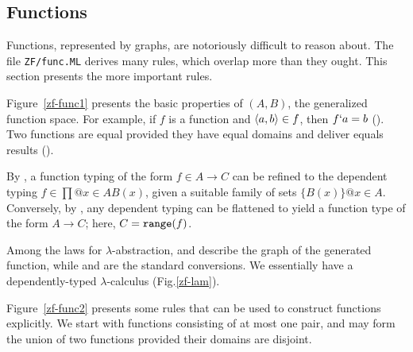 \subsection{Functions}
Functions, represented by graphs, are notoriously difficult to reason
about.  The file \texttt{ZF/func.ML} derives many rules, which overlap more
than they ought.  This section presents the more important rules.

Figure~\ref{zf-func1} presents the basic properties of $(A,B)$,
the generalized function space.  For example, if $f$ is a function and
$\langle a,b\rangle\in f$, then $f`a=b$ ().  Two functions
are equal provided they have equal domains and deliver equals results
().

By , a function typing of the form $f\in A\to C$ can be
refined to the dependent typing $f\in\prod@{x\in A}B(x)$, given a suitable
family of sets $\{B(x)\}@{x\in A}$.  Conversely, by ,
any dependent typing can be flattened to yield a function type of the form
$A\to C$; here, $C={\tt range}(f)$.

Among the laws for $\lambda$-abstraction,  and 
describe the graph of the generated function, while  and
 are the standard conversions.  We essentially have a
dependently-typed $\lambda$-calculus (Fig.\ts\ref{zf-lam}).

Figure~\ref{zf-func2} presents some rules that can be used to construct
functions explicitly.  We start with functions consisting of at most one
pair, and may form the union of two functions provided their domains are
disjoint.  



